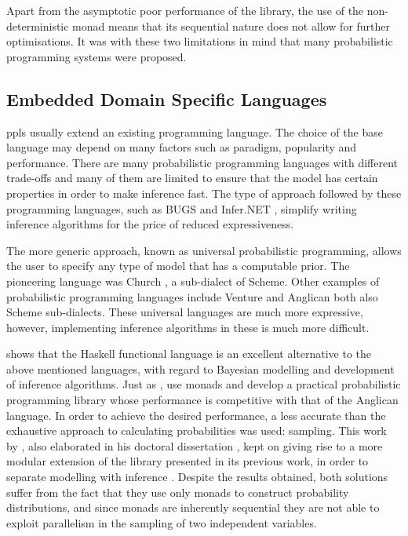 \documentclass[
  oneside,
  11pt, a4paper,
  footinclude=true,
  headinclude=true,
  cleardoublepage=empty
]{scrbook}
\theoremstyle{definition}
\theoremstyle{definition}
\begin{document}
         Apart from the asymptotic poor performance of the \cite{erwig_kollmansberger_2006} library, the use of the non-deterministic monad means that its sequential nature does not allow for further optimisations. It was with these two limitations in mind that many probabilistic programming systems were proposed.
        
        \subsection{Embedded Domain Specific Languages}\label{rel-work-edsl}
        
        \glspl{ppl} usually extend an existing programming language. The choice of the base language may depend on many factors such as paradigm, popularity and performance. There are many probabilistic programming languages with different trade-offs \citep{Scibior:2015:PPP:2887747.2804317} and many of them are limited to ensure that the model has certain properties in order to make inference fast. The type of approach followed by these programming languages, such as BUGS \citep{gilks1994language} and Infer.NET \citep{minkainfer}, simplify writing inference algorithms for the price of reduced expressiveness.
        
        The more generic approach, known as universal probabilistic programming, allows the user to specify any type of model that has a computable prior. The pioneering language was Church \citep{goodman2012church}, a sub-dialect of Scheme. Other examples of probabilistic programming languages include Venture and Anglican \citep{mansinghka2014venture, tolpin2015probabilistic} both also Scheme sub-dialects. These universal languages are much more expressive, however, implementing inference algorithms in these is much more difficult.
                
        \cite{Scibior:2015:PPP:2887747.2804317} shows that the Haskell functional language is an excellent alternative to the above mentioned languages, ​with regard to Bayesian modelling and development of inference algorithms. Just as \cite{erwig_kollmansberger_2006}, \cite{Scibior:2015:PPP:2887747.2804317} use monads and develop a practical probabilistic programming library whose performance is competitive with that of the Anglican language. In order to achieve the desired performance, a less accurate than the exhaustive approach to calculating probabilities was used: sampling. This work by \cite{Scibior:2015:PPP:2887747.2804317}, also elaborated in his doctoral dissertation \citep{Scibior19}, kept on giving rise to a more modular extension of the library presented in its previous work, in order to separate modelling with inference \citep{scibior2018functional}. Despite the results obtained, both solutions suffer from the fact that they use only monads to construct probability distributions, and since monads are inherently sequential they are not able to exploit parallelism in the sampling of two independent variables.
                
\end{document}
